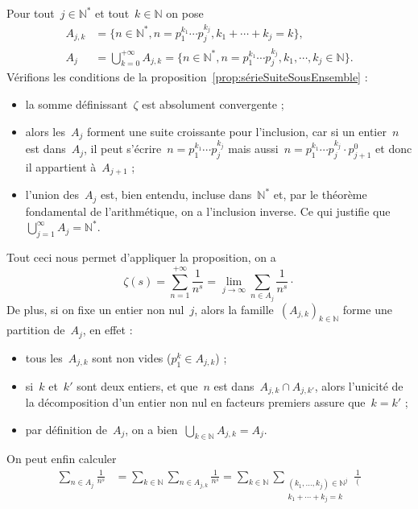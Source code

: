 \begin{dem}
			Pour tout~$j\in\mathbb{N}^*$ et tout~$k\in\mathbb{N}$ on pose
			\begin{align*}
				A_{j,k}	&=\{n\in\mathbb{N}^*,n=p_1^{k_1} \cdots p_j^{k_j}, 
																k_1+\cdots  	+k_j=k\},\\
				A_j	   	&=\bigcup_{k=0}^{+\infty} A_{j,k}
						 = \{ n\in\mathbb{N}^*, n = p_1^{k_1}\cdots p_j^{k_j}, k_1,\cdots,k_j \in\mathbb{N} \}.
			\end{align*}
			Vérifions les conditions de la proposition~\ref{prop:sérieSuiteSousEnsemble} :
			\begin{itemize}
				\item la somme définissant~$\zeta$ est absolument convergente ;
				\item alors les~$A_j$ forment une suite croissante pour l'inclusion, car si un entier~$n$ est dans~$A_j$, il peut s'écrire~$n=p_1^{k_1}\cdots p_j^{k_j}$ mais aussi~$n = p_1^{k_1}\cdots p_j^{k_j} \cdot p_{j+1}^0$ et donc il appartient à~$A_{j+1}$ ;
				\item l'union des~$A_j$ est, bien entendu, incluse dans~$\mathbb{N}^*$ et, par le théorème fondamental de l'arithmétique, on a l'inclusion inverse. Ce qui justifie que~$\bigcup_{j=1}^\infty A_j = \mathbb{N}^*$.
			\end{itemize}
			Tout ceci nous permet d'appliquer la proposition, on a
			\[
				\zeta(s) 	= \sum_{n=1}^{+\infty}\frac{1}{n^s}
							= \lim_{j\rightarrow\infty} \sum_{n\in A_j} \frac{1}{n^s}\cdot
			\]
			De plus, si on fixe un entier non nul~$j$,  alors la famille~$\left(A_{j,k}\right)_{k\in\mathbb{N}}$ forme une partition de~$A_j$, en effet :
			\begin{itemize}
				\item tous les~$A_{j,k}$ sont non vides ($p_1^k\in A_{j,k}$) ;
				\item si~$k$ et~$k'$ sont deux entiers, et que~$n$ est dans~$A_{j,k}\cap A_{j,k'}$, alors l'unicité de la décomposition d'un entier non nul en facteurs premiers assure que~$k=k'$ ;
				\item par définition de~$A_j$, on a bien~$\bigcup_{k\in\mathbb{N}} A_{j,k} = A_j$.
			\end{itemize}
			On peut enfin calculer 
			\begin{align*}
				\sum_{n\in A_j} \frac{1}{n^s}
							& = \sum_{k\in\mathbb{N}}\sum_{n\in A_{j,k}} \frac{1}{n^s}
							  = \sum_{k\in\mathbb{N}}\sum_
							  		{\substack{(k_1,\ldots,k_j)\in\mathbb{N}^j\\
							  					k_1+\cdots+k_j = k}}
							  		\frac{1}{\left(
}
\end{align*}
\end{dem}
